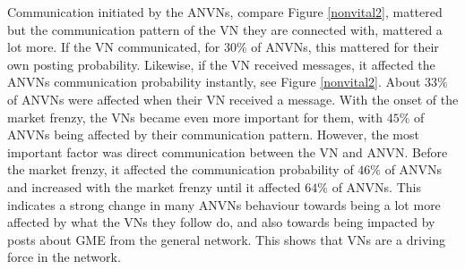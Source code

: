 Communication initiated by the ANVNs, compare Figure \ref{nonvital2}, mattered but the communication pattern of the VN they are connected with, mattered a lot more. If the VN communicated, for $30\%$ of ANVNs, this mattered for their own posting probability. Likewise, if the VN received messages, it affected the ANVNs communication probability instantly, see Figure \ref{nonvital2}. About $33\%$ of ANVNs were affected when their VN received a message. With the onset of the market frenzy, the VNs became even more important for them, with $45\%$ of ANVNs being affected by their communication pattern. However, the most important factor was direct communication between the VN and ANVN. Before the market frenzy, it affected the communication probability of $46\%$ of ANVNs and increased with the market frenzy until it affected $64\%$ of ANVNs. This indicates a strong change in many ANVNs behaviour towards being a lot more affected by what the VNs they follow do, and also towards being impacted by posts about GME from the general network. This shows that VNs are a driving force in the network.










